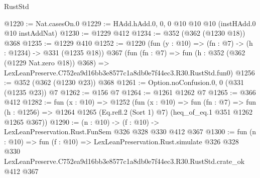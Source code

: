 \begin{lexlean}{RustStd}
\begin{coremodule}
@1220 := Nat.casesOn.{0}
@1229 := HAdd.hAdd.{0, 0, 0} @10 @10 @10 (instHAdd.{0} @10 instAddNat)
@1230 := @1229 @412
@1234 := @352 (@362 (@1230 @18)) @368
@1235 := @1229 @410
@1252 := @1220
    (fun (y : @10) => (fn : @7) -> (h : @1234) -> @331 (@1235 @18))
    @367
    (fun (fn : @7) =>
    fun (h : @352 (@362 (@1229 Nat.zero @18)) @368) =>
    LexLeanPreserve.C752ea9d16bb3e8577c1a8db0e7f44ec3.R30.RustStd.fun0)
@1256 := @352 (@362 (@1230 @23)) @368
@1261 := Option.noConfusion.{0, 0} (@331 (@1235 @23)) @7
@1262 := @156 @7
@1264 := @1261 @1262 @7
@1265 := @366 @412
@1282 := fun (x : @10) =>
  @1252
    (fun (x : @10) =>
    fun (fn : @7) =>
    fun (h : @1256) => @1264 @1265 (Eq.refl.{2} (Sort 1) @7) (heq_of_eq.{1} @351 @1262 @1265 @367))
@1290 := (n : @10) -> (f : @10) -> LexLeanPreservation.Rust.FunSem @326 @328 @330 @412 @367
@1300 := fun (n : @10) =>
  fun (f : @10) =>
  LexLeanPreservation.Rust.simulate
    @326
    @328
    @330
    LexLeanPreserve.C752ea9d16bb3e8577c1a8db0e7f44ec3.R30.RustStd.crate_ok
    @412
    @367
\end{coremodule}
\end{lexlean}
